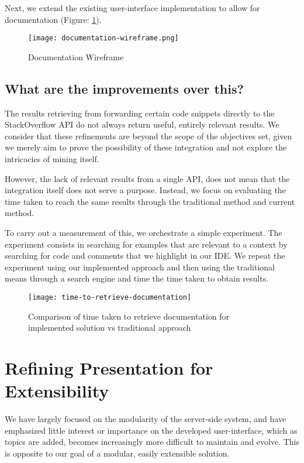 Next, we extend the existing user-interface implementation to allow for documentation (Figure: \ref{fig:documentationWireframe}).

\begin{figure}[h!]
	\centering
	\texttt{[image: documentation-wireframe.png]}
	\caption{Documentation Wireframe}
	\label{fig:documentationWireframe}
\end{figure}

\subsection{What are the improvements over this?}

The results retrieving from forwarding certain code snippets directly to the StackOverflow API do not always return useful, entirely relevant results. We consider that these refinements are beyond the scope of the objectives set, given we merely aim to prove the possibility of these integration and not explore the intricacies of mining itself.

However, the lack of relevant results from a single API, does not mean that the integration itself does not serve a purpose. Instead, we focus on evaluating the time taken to reach the same results through the traditional method and current method.

To carry out a measurement of this, we orchestrate a simple experiment. The experiment consists in searching for examples that are relevant to a context by searching for code and comments that we highlight in our IDE. We repeat the experiment using our implemented approach and then using the traditional means through a search engine and time the time taken to obtain results.

\begin{figure}[h]
	\centering
	\texttt{[image: time-to-retrieve-documentation]}
	\caption{Comparison of time taken to retrieve documentation for implemented solution vs traditional approach}
	\label{fig:time-to-retrieve-documentation}
\end{figure}


\section{Refining Presentation for Extensibility}

We have largely focused on the modularity of the server-side system, and have emphasized little interest or importance on the developed user-interface, which as topics are added, becomes increasingly more difficult to maintain and evolve. This is opposite to our goal of a modular, easily extensible solution.

